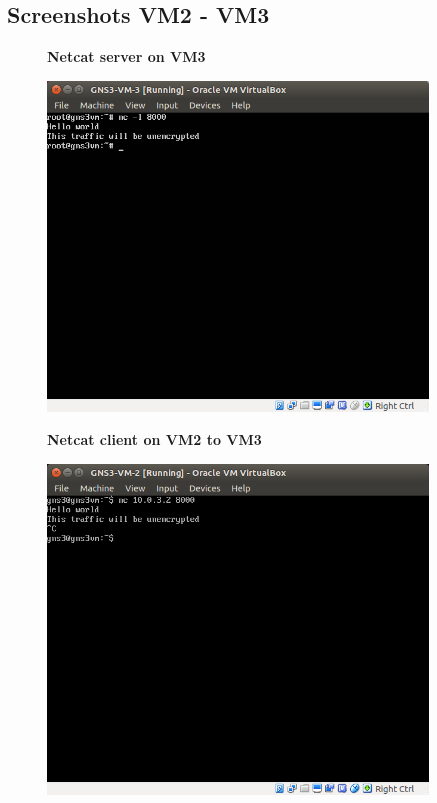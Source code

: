 \documentclass[a4paper]{scrreprt}
\begin{document}
\subsection{Screenshots VM2 - VM3}

\begin{figure}[H]
    \centering
    \textbf{Netcat server on VM3}\par\medskip
    \includegraphics[width=0.9\textwidth]{resources/nc_vm3.png}
\end{figure}

\begin{figure}[H]
    \centering
    \textbf{Netcat client on VM2 to VM3}\par\medskip
    \includegraphics[width=0.9\textwidth]{resources/nc_vm2_to_vm3.png}
\end{figure}
\end{document}

